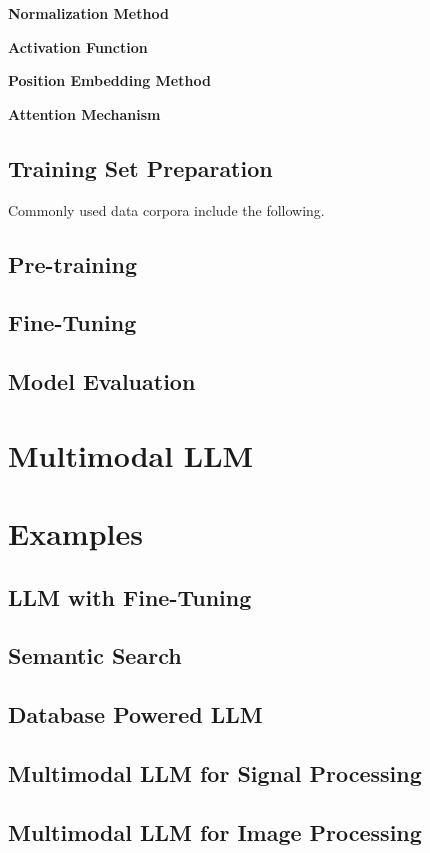 \vspace{0.1in}
\noindent \textbf{Normalization Method}
\vspace{0.1in}

\vspace{0.1in}
\noindent \textbf{Activation Function}
\vspace{0.1in}

\vspace{0.1in}
\noindent \textbf{Position Embedding Method}
\vspace{0.1in}

\vspace{0.1in}
\noindent \textbf{Attention Mechanism}
\vspace{0.1in}

\subsection{Training Set Preparation}

Commonly used data corpora include the following. 

\subsection{Pre-training}

\subsection{Fine-Tuning}

\subsection{Model Evaluation}

\section{Multimodal LLM}

\section{Examples}

\subsection{LLM with Fine-Tuning}

\subsection{Semantic Search}

\subsection{Database Powered LLM}

\subsection{Multimodal LLM for Signal Processing}

\subsection{Multimodal LLM for Image Processing}

